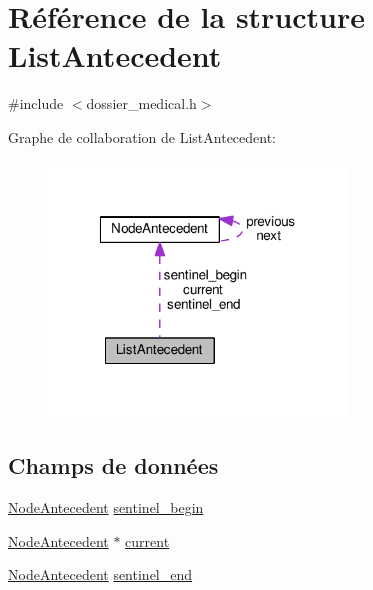 \hypertarget{struct_list_antecedent}{\section{Référence de la structure List\-Antecedent}
\label{struct_list_antecedent}
}


{\ttfamily \#include $<$dossier\-\_\-medical.\-h$>$}



Graphe de collaboration de List\-Antecedent\-:
\nopagebreak
\begin{figure}[H]
\begin{center}
\leavevmode
\includegraphics[width=226pt]{struct_list_antecedent__coll__graph}
\end{center}
\end{figure}
\subsection*{Champs de données}
\begin{DoxyCompactItemize}
\item 
\hyperlink{struct_node_antecedent}{Node\-Antecedent} \hyperlink{struct_list_antecedent_a2aa9bf6f515609f5be242be5c329e78b}{sentinel\-\_\-begin}
\item 
\hyperlink{struct_node_antecedent}{Node\-Antecedent} $\ast$ \hyperlink{struct_list_antecedent_a93d09acaf5d014c14988d6a2b03cb6c3}{current}
\item 
\hyperlink{struct_node_antecedent}{Node\-Antecedent} \hyperlink{struct_list_antecedent_a7f9cde4039bce42b1cdf76bb41731bb4}{sentinel\-\_\-end}
\end{DoxyCompactItemize}


